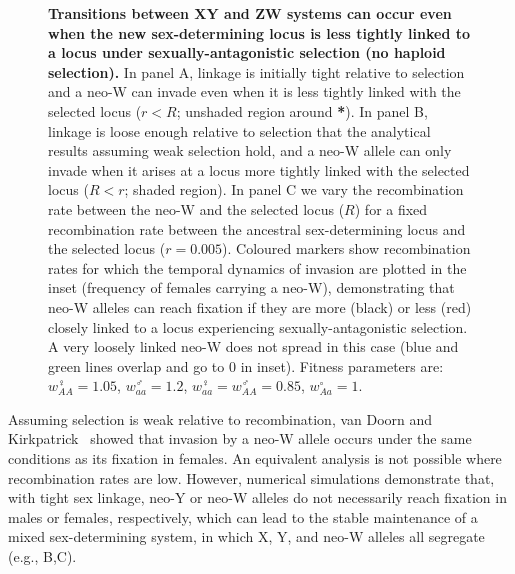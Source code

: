 \documentclass[10pt,letterpaper]{article}
\providecommand{\DIFdelbeginFL}{} %
\providecommand{\DIFdelendFL}{} %
\begin{document}
\begin{figure}[!h]
\centering
\DIFdelbeginFL %
\DIFdelendFL %
\caption{
{\bf Transitions between XY and ZW systems can occur even when the new sex-determining locus is less tightly linked to a locus under sexually-antagonistic selection (no haploid selection).}
In panel A, linkage is initially tight relative to selection and a neo-W can invade even when it is less tightly linked with the selected locus ($r<R$; unshaded region around \textbf{*}).
In panel B, linkage is loose enough relative to selection that the analytical results assuming weak selection hold, and a neo-W allele can only invade when it arises at a locus more tightly linked with the selected locus ($R<r$; shaded region).
In panel C we vary the recombination rate between the neo-W and the selected locus ($R$) for a fixed recombination rate between the ancestral sex-determining locus and the selected locus ($r=0.005$). 
Coloured markers show recombination rates for which the temporal dynamics of invasion are plotted in the inset (frequency of females carrying a neo-W), demonstrating that neo-W alleles can reach fixation if they are more (black) or less (red) closely linked to a locus experiencing sexually-antagonistic selection. 
A very loosely linked neo-W does not spread in this case (blue and green lines overlap and go to 0 in inset). 
Fitness parameters are: $w_{AA}^\female = 1.05$, $w_{aa}^\male = 1.2$, $w_{aa}^\female = w_{AA}^\male = 0.85$, $w_{Aa}^\circ = 1$.
}
\label{fig:SexAntagTighter}
\end{figure}

Assuming selection is weak relative to recombination, van Doorn and Kirkpatrick~\cite{vanDoorn:2010hu} showed that invasion by a neo-W allele occurs under the same conditions as its fixation in females.
An equivalent analysis is not possible where recombination rates are low. 
However, numerical simulations demonstrate that, with tight sex linkage, neo-Y or neo-W alleles do not necessarily reach fixation in males or females, respectively, which can lead to the stable maintenance of a mixed sex-determining system, in which X, Y, and neo-W alleles all segregate (e.g., B,C).
\end{document}
